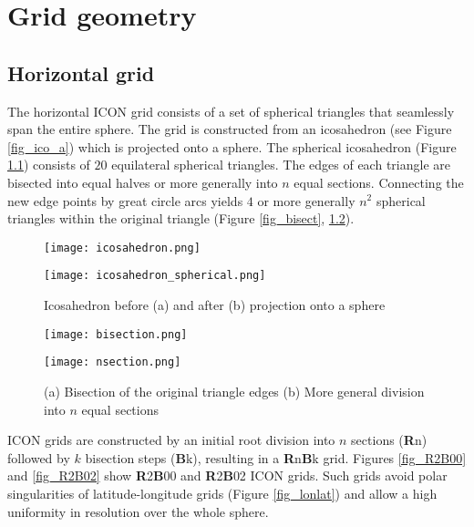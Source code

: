 \chapter{Grid geometry}

\section{Horizontal grid}
The horizontal ICON grid consists of a set of spherical triangles that seamlessly span the entire sphere. The grid is constructed from an icosahedron (see Figure 
\ref{fig_ico_a}) which is projected onto a sphere. The spherical icosahedron (Figure \ref{fig_ico_b}) consists of $20$ equilateral spherical triangles. The edges of each triangle 
are bisected into equal halves or more generally into $n$ equal sections. Connecting the new edge points by great circle arcs yields $4$ or more generally $n^2$ spherical triangles 
within the original triangle (Figure \ref{fig_bisect}, \ref{fig_nsect}). 

\begin{figure}[h]
  \begin{minipage}[b]{0.4\textwidth}
    \centering
    \texttt{[image: icosahedron.png]}
    \subcaption{}\label{fig_ico_a}
  \end{minipage}\hfill
  \begin{minipage}[b]{0.4\textwidth}
    \centering
    \texttt{[image: icosahedron\_spherical.png]}
    \subcaption{}\label{fig_ico_b}
  \end{minipage}\hfill
  \caption{Icosahedron before (a) and after (b) projection onto a sphere }
\end{figure}

\begin{figure}[h]
  \begin{minipage}[b]{0.4\textwidth}
    \centering
    \texttt{[image: bisection.png]}
    \subcaption{}\label{fig_bisect}
  \end{minipage}\hfill
  \begin{minipage}[b]{0.4\textwidth}
    \centering
    \texttt{[image: nsection.png]}
    \subcaption{}\label{fig_nsect}
  \end{minipage}\hfill
  \caption{(a) Bisection of the original triangle edges (b) More general division into $n$ equal sections}
\end{figure}

ICON grids are constructed by an initial root division into $n$ sections (\textbf{R}n) followed by $k$ bisection steps (\textbf{B}k), resulting in a \textbf{R}n\textbf{B}k grid. 
Figures \ref{fig_R2B00} and \ref{fig_R2B02} show \textbf{R}2\textbf{B}00 and \textbf{R}2\textbf{B}02 ICON grids. Such grids avoid polar singularities of latitude-longitude grids 
(Figure \ref{fig_lonlat}) and allow a high uniformity in resolution over the whole sphere.

